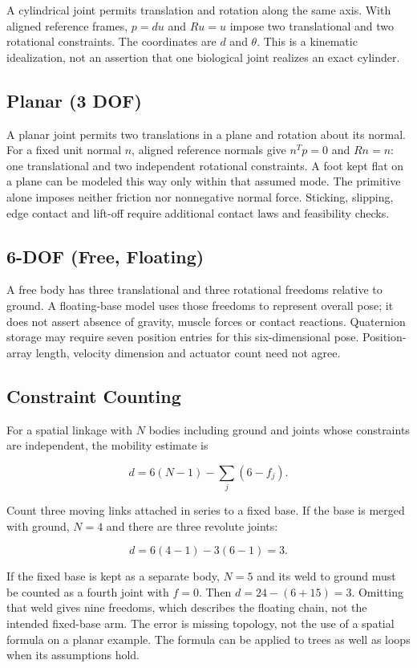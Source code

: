 A cylindrical joint permits translation and rotation along the same axis. With aligned reference frames, \(p=d u\) and \(Ru=u\) impose two translational and two rotational constraints. The coordinates are \(d\) and \(\theta\). This is a kinematic idealization, not an assertion that one biological joint realizes an exact cylinder.

\subsection{Planar (3 DOF)}\label{planar-3-dof}

A planar joint permits two translations in a plane and rotation about its normal. For a fixed unit normal \(n\), aligned reference normals give \(n^T p=0\) and \(Rn=n\): one translational and two independent rotational constraints. A foot kept flat on a plane can be modeled this way only within that assumed mode. The primitive alone imposes neither friction nor nonnegative normal force. Sticking, slipping, edge contact and lift-off require additional contact laws and feasibility checks.

\subsection{6-DOF (Free, Floating)}\label{dof-free-floating}

A free body has three translational and three rotational freedoms relative to ground. A floating-base model uses those freedoms to represent overall pose; it does not assert absence of gravity, muscle forces or contact reactions. Quaternion storage may require seven position entries for this six-dimensional pose. Position-array length, velocity dimension and actuator count need not agree.

\subsection{Constraint Counting}\label{constraint-counting}

For a spatial linkage with \(N\) bodies including ground and joints whose constraints are independent, the mobility estimate is

\[
d=6(N-1)-\sum_j(6-f_j).
\]

Count three moving links attached in series to a fixed base. If the base is merged with ground, \(N=4\) and there are three revolute joints:

\[
d=6(4-1)-3(6-1)=3.
\]

If the fixed base is kept as a separate body, \(N=5\) and its weld to ground must be counted as a fourth joint with \(f=0\). Then \(d=24-(6+15)=3\). Omitting that weld gives nine freedoms, which describes the floating chain, not the intended fixed-base arm. The error is missing topology, not the use of a spatial formula on a planar example. The formula can be applied to trees as well as loops when its assumptions hold.

